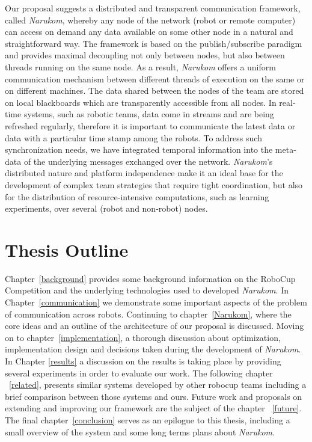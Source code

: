 Our proposal suggests a distributed and transparent communication framework, called \textit{Narukom}, whereby any node
of the network (robot or remote computer) can access on demand any data available on some other node in a natural and
straightforward way. The framework is based on the publish/subscribe paradigm and provides maximal decoupling not only
between nodes, but also between threads running on the same node. As a result, \textit{Narukom} offers a uniform communication
mechanism between different threads of execution on the same or on different machines. The data shared between the nodes
of the team are stored on local blackboards which are transparently accessible from all nodes. In real-time systems,
such as robotic teams, data come in streams and are being refreshed regularly, therefore it is important to communicate
the latest data or data with a particular time stamp among the robots. To address such synchronization needs, we have
integrated temporal information into the meta-data of the underlying messages exchanged over the network. \textit{Narukom}'s
distributed nature and platform independence make it an ideal base for the development of complex team strategies that
require tight coordination, but also for the distribution of resource-intensive computations, such as learning
experiments, over several (robot and non-robot) nodes.

\section{Thesis Outline}
Chapter~\ref{background} provides some background information on the RoboCup Competition and the underlying technologies used to developed \textit{Narukom}. In Chapter~\ref{communication} we demonstrate some important aspects of the problem of communication across robots. Continuing to chapter~\ref{Narukom}, where the core ideas and an outline of the architecture of our proposal is discussed. Moving on to chapter~\ref{implementation}, a thorough discussion about optimization, implementation design and decisions taken during  the development of \textit{Narukom}. In Chapter \ref{results} a discussion on the results is taking place by providing several experiments in order to evaluate our work. The following chapter ~\ref{related}, presents similar systems developed by other robocup teams including a brief comparison between those systems and ours. Future work and proposals on extending and improving our framework are  the subject of the chapter ~\ref{future}. The final chapter~\ref{conclusion} serves as an epilogue to this thesis, including  a small overview of the system and some long terms plans about \textit{Narukom}.